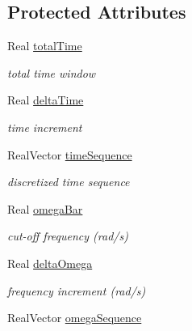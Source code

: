 \subsection*{Protected Attributes}
\begin{DoxyCompactItemize}
\item 
Real \hyperlink{classPecos_1_1InverseTransformation_a0b7e8700325688780b8907292cfc581d}{total\+Time}\label{classPecos_1_1InverseTransformation_a0b7e8700325688780b8907292cfc581d}

\begin{DoxyCompactList}\small\item\em total time window \end{DoxyCompactList}\item 
Real \hyperlink{classPecos_1_1InverseTransformation_a76b36c18f595ebb232d960272004e2cf}{delta\+Time}\label{classPecos_1_1InverseTransformation_a76b36c18f595ebb232d960272004e2cf}

\begin{DoxyCompactList}\small\item\em time increment \end{DoxyCompactList}\item 
Real\+Vector \hyperlink{classPecos_1_1InverseTransformation_a2d9d6c6e9be9cbe8504e5193a2bfb44f}{time\+Sequence}\label{classPecos_1_1InverseTransformation_a2d9d6c6e9be9cbe8504e5193a2bfb44f}

\begin{DoxyCompactList}\small\item\em discretized time sequence \end{DoxyCompactList}\item 
Real \hyperlink{classPecos_1_1InverseTransformation_ae58b738711bb39b110ee92f41852a088}{omega\+Bar}\label{classPecos_1_1InverseTransformation_ae58b738711bb39b110ee92f41852a088}

\begin{DoxyCompactList}\small\item\em cut-\/off frequency (rad/s) \end{DoxyCompactList}\item 
Real \hyperlink{classPecos_1_1InverseTransformation_a4733a45fbc8d43aa632eca62dfa11694}{delta\+Omega}\label{classPecos_1_1InverseTransformation_a4733a45fbc8d43aa632eca62dfa11694}

\begin{DoxyCompactList}\small\item\em frequency increment (rad/s) \end{DoxyCompactList}\item 
Real\+Vector \hyperlink{classPecos_1_1InverseTransformation_a0b7820a4e99c52ee3a7243174371bef2}{omega\+Sequence}\label{classPecos_1_1InverseTransformation_a0b7820a4e99c52ee3a7243174371bef2}


\end{DoxyCompactItemize}

